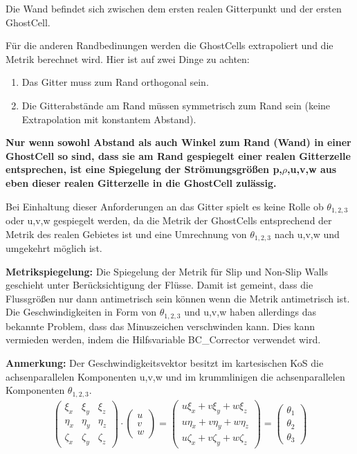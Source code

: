 Die Wand befindet sich zwischen dem ersten realen Gitterpunkt und der ersten GhostCell.
\par
Für die anderen Randbedinungen werden die GhostCells extrapoliert und die Metrik berechnet wird.
Hier ist auf zwei Dinge zu achten:
\begin{enumerate}
\item Das Gitter muss zum Rand orthogonal sein.
\item Die Gitterabstände am Rand müssen symmetrisch zum Rand sein (keine Extrapolation mit konstantem Abstand).
\end{enumerate}
\textbf{Nur wenn sowohl Abstand als auch Winkel zum Rand (Wand) in einer GhostCell so sind, dass sie am Rand gespiegelt einer realen Gitterzelle entsprechen, ist eine Spiegelung der Strömungsgrößen p,$\rho$,u,v,w aus eben dieser realen Gitterzelle in die GhostCell zulässig.}
\par
Bei Einhaltung dieser Anforderungen an das Gitter spielt es keine Rolle ob $\theta_{1,2,3}$ oder u,v,w gespiegelt werden, 
da die Metrik der GhostCells entsprechend der Metrik des realen Gebietes ist und eine Umrechnung von $\theta_{1,2,3}$ nach u,v,w und umgekehrt möglich ist. 
\par
\textbf{Metrikspiegelung:} Die Spiegelung der Metrik für Slip und Non-Slip Walls geschieht unter Berücksichtigung der Flüsse. Damit ist gemeint, dass die Flussgrößen nur dann antimetrisch sein können wenn die Metrik antimetrisch ist. Die Geschwindigkeiten in Form von $\theta_{1,2,3}$ und u,v,w haben allerdings das bekannte Problem, dass das Minuszeichen verschwinden kann. Dies kann vermieden werden, indem die Hilfsvariable BC\_Corrector verwendet wird.
\par
\textbf{Anmerkung:} Der Geschwindigkeitsvektor besitzt im kartesischen KoS die achsenparallelen Komponenten u,v,w und im krummlinigen die achsenparallelen Komponenten $\theta_{1,2,3}$.
\begin{align*}
\begin{pmatrix}
\xi_x & \xi_y & \xi_z
\\
\eta_x & \eta_y & \eta_z
\\
\zeta_x & \zeta_y & \zeta_z
\end{pmatrix}
\cdot
\begin{pmatrix}
u
\\
v
\\
w
\end{pmatrix}
=
\begin{pmatrix}
u \xi_x + v \xi_y + w \xi_z 
\\
u \eta_x + v \eta_y + w \eta_z 
\\
u \zeta_x + v \zeta_y + w \zeta_z 
\end{pmatrix}
=\begin{pmatrix}
\theta_1
\\
\theta_2
\\
\theta_3
\end{pmatrix}
\end{align*}


